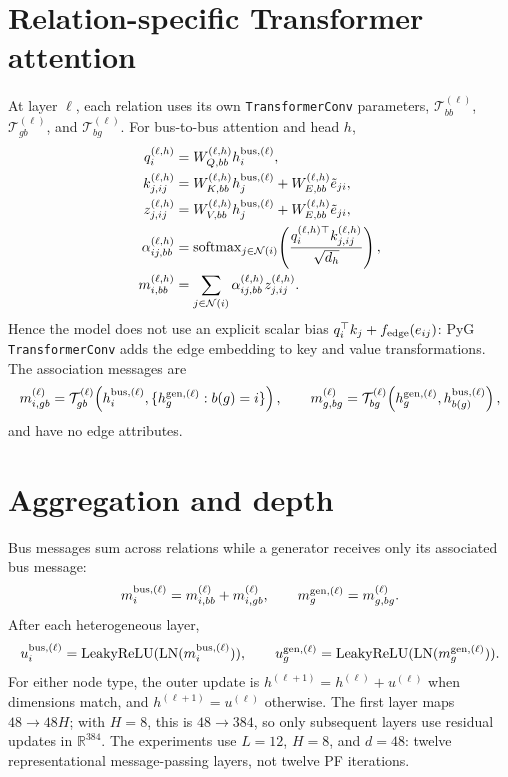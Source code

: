 \documentclass[11pt,a4paper]{article}
\newcommand{\R}{\mathbb{R}}
\newcommand{\LN}{\operatorname{LN}}
\begin{document}
\section{Relation-specific Transformer attention}
At layer $\ell$, each relation uses its own \texttt{TransformerConv} parameters, $\mathcal T_{bb}^{(\ell)}$, $\mathcal T_{gb}^{(\ell)}$, and $\mathcal T_{bg}^{(\ell)}$. For bus-to-bus attention and head $h$,
\begin{align*}
q_i^{(\ell,h)}&=W_{Q,bb}^{(\ell,h)}h_i^{\rm bus,(\ell)},\\
k_{j,ij}^{(\ell,h)}&=W_{K,bb}^{(\ell,h)}h_j^{\rm bus,(\ell)}+W_{E,bb}^{(\ell,h)}\tilde e_{ji},\\
z_{j,ij}^{(\ell,h)}&=W_{V,bb}^{(\ell,h)}h_j^{\rm bus,(\ell)}+W_{E,bb}^{(\ell,h)}\tilde e_{ji},\\
\alpha_{ij,bb}^{(\ell,h)}&=\operatorname{softmax}_{j\in\mathcal N(i)}\!\left(\frac{q_i^{(\ell,h)\top}k_{j,ij}^{(\ell,h)}}{\sqrt{d_h}}\right),\\
m_{i,bb}^{(\ell,h)}&=\sum_{j\in\mathcal N(i)}\alpha_{ij,bb}^{(\ell,h)}z_{j,ij}^{(\ell,h)}.
\end{align*}
Hence the model does not use an explicit scalar bias $q_i^\top k_j+f_{\rm edge}(e_{ij})$: PyG \texttt{TransformerConv} adds the edge embedding to key and value transformations. The association messages are
\[
m_{i,gb}^{(\ell)}=\mathcal T_{gb}^{(\ell)}\!\left(h_i^{\rm bus,(\ell)},\{h_g^{\rm gen,(\ell)}:b(g)=i\}\right),\qquad
m_{g,bg}^{(\ell)}=\mathcal T_{bg}^{(\ell)}\!\left(h_g^{\rm gen,(\ell)},h_{b(g)}^{\rm bus,(\ell)}\right),
\]
and have no edge attributes.

\section{Aggregation and depth}
Bus messages sum across relations while a generator receives only its associated bus message:
\[
m_i^{\rm bus,(\ell)}=m_{i,bb}^{(\ell)}+m_{i,gb}^{(\ell)},\qquad m_g^{\rm gen,(\ell)}=m_{g,bg}^{(\ell)}.
\]
After each heterogeneous layer,
\[
u_i^{\rm bus,(\ell)}=\operatorname{LeakyReLU}(\LN(m_i^{\rm bus,(\ell)})),\qquad
u_g^{\rm gen,(\ell)}=\operatorname{LeakyReLU}(\LN(m_g^{\rm gen,(\ell)})).
\]
For either node type, the outer update is $h^{(\ell+1)}=h^{(\ell)}+u^{(\ell)}$ when dimensions match, and $h^{(\ell+1)}=u^{(\ell)}$ otherwise. The first layer maps $48\to48H$; with $H=8$, this is $48\to384$, so only subsequent layers use residual updates in $\R^{384}$. The experiments use $L=12$, $H=8$, and $d=48$: twelve representational message-passing layers, not twelve PF iterations.
\end{document}
